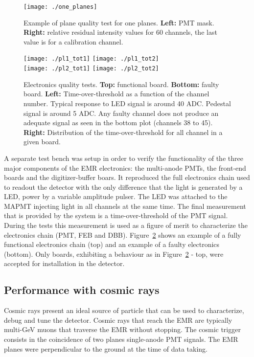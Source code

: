 \documentclass[a4paper,11pt]{article}
\begin{document}
\begin{figure}[htb]
 \centering
 \texttt{[image: ./one\_planes]}
 \caption[Example of plane quality tests]{Example of plane quality test for one planes. {\bf Left:} PMT mask. {\bf Right:} relative residual intensity values
 for 60 channels, the last value is for a calibration channel.}
 \label{fig:plane_tests_one_planes}
\end{figure}


\begin{figure}[htb]
 \centering
 \texttt{[image: ./pl1\_tot1]}
 \texttt{[image: ./pl1\_tot2]}\\
 \texttt{[image: ./pl2\_tot1]}
 \texttt{[image: ./pl2\_tot2]}
 \caption[Electronics quality tests]{Electronics quality tests. {\bf Top:} functional board. {\bf Bottom:} faulty board. {\bf Left:} Time-over-threshold
 as a function of the channel number. Typical response to LED signal is around 40 ADC. Pedestal signal is around 5 ADC. Any faulty channel does not produce
 an adequate signal as seen in the bottom plot (channels 38 to 45). {\bf Right:} Distribution of the time-over-threshold for all channel in a given board.}
 \label{fig:tot_feb_dbb_test}
\end{figure}

A separate test bench was setup in order to verify the functionality of the three major components of the EMR electronics: the multi-anode PMTs, the 
front-end boards and the digitizer-buffer boars. It reproduced the full electronics chain used to readout the detector with the only difference that the
light is generated by a LED, power by a variable amplitude pulser. The LED was attached to the MAPMT injecting light in all channels at the same time. The
final measurement that is provided by the system is a time-over-threshold of the PMT signal. During the tests this measurement is used as a figure of merit
to characterize the electronics chain (PMT, FEB and DBB). Figure~\ref{fig:tot_feb_dbb_test} shows an example of a fully functional electronics chain (top)
and an example of a faulty electronics (bottom). Only boards, exhibiting a behaviour as in Figure~\ref{fig:tot_feb_dbb_test} - top, were accepted for
installation in the detector.

\subsection{Performance with cosmic rays}\label{sec:cosmic_perf}
Cosmic rays present an ideal source of particle that can be used to characterize, debug and tune the detector. Cosmic rays that reach the EMR are typically multi-GeV muons that traverse the EMR without stopping. The cosmic trigger consists in the coincidence of two planes single-anode PMT signals. The EMR planes were perpendicular to the ground at the time of data taking.
\end{document}
